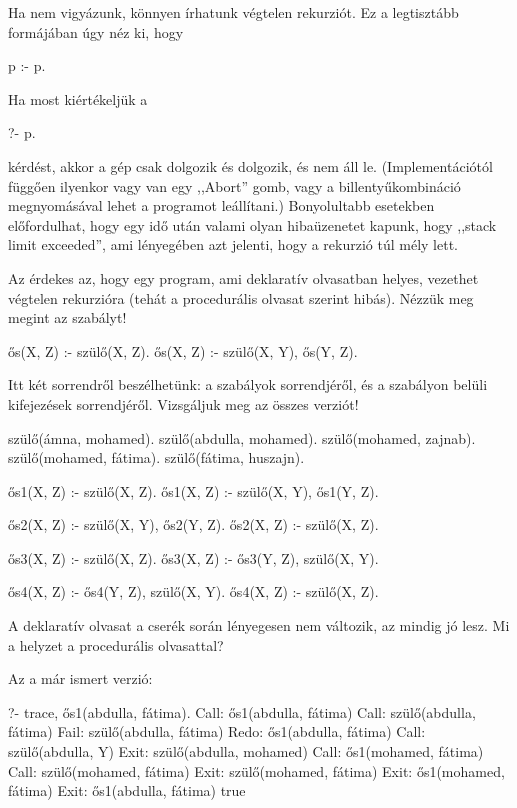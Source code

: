 Ha nem vigyázunk, könnyen írhatunk végtelen rekurziót. Ez a legtisztább formájában úgy néz ki, hogy
\begin{program}
p :- p.
\end{program}

Ha most kiértékeljük a
\begin{query}
?- p.
\end{query}
kérdést, akkor a gép csak dolgozik és dolgozik, és
nem áll le. (Implementációtól függően ilyenkor vagy
van egy ,,Abort'' gomb, vagy a 
billentyűkombináció megnyomásával lehet a programot
leállítani.) Bonyolultabb esetekben előfordulhat,
hogy egy idő után valami olyan hibaüzenetet kapunk,
hogy ,,stack limit exceeded'', ami lényegében azt
jelenti, hogy a rekurzió túl mély lett.

Az érdekes az, hogy egy program, ami deklaratív
olvasatban helyes, vezethet végtelen rekurzióra
(tehát a procedurális olvasat szerint hibás). Nézzük
meg megint az  szabályt!
\begin{program}
ős(X, Z) :- szülő(X, Z).
ős(X, Z) :- szülő(X, Y), ős(Y, Z).
\end{program}
Itt két sorrendről beszélhetünk: a szabályok
sorrendjéről, és a szabályon belüli kifejezések
sorrendjéről. Vizsgáljuk meg az összes verziót!
\begin{program}
szülő(ámna, mohamed).
szülő(abdulla, mohamed).
szülő(mohamed, zajnab).
szülő(mohamed, fátima).
szülő(fátima, huszajn).

ős1(X, Z) :- szülő(X, Z).
ős1(X, Z) :- szülő(X, Y), ős1(Y, Z).

ős2(X, Z) :- szülő(X, Y), ős2(Y, Z).
ős2(X, Z) :- szülő(X, Z).

ős3(X, Z) :- szülő(X, Z).
ős3(X, Z) :- ős3(Y, Z), szülő(X, Y).

ős4(X, Z) :- ős4(Y, Z), szülő(X, Y).
ős4(X, Z) :- szülő(X, Z).
\end{program}
A deklaratív olvasat a cserék során lényegesen nem
változik, az mindig jó lesz. Mi a helyzet a
procedurális olvasattal?

Az  a már ismert verzió:
\begin{query}
?- trace, ős1(abdulla, fátima).
Call: ős1(abdulla, fátima)
  Call: szülő(abdulla, fátima)
  Fail: szülő(abdulla, fátima)
Redo: ős1(abdulla, fátima)
  Call: szülő(abdulla, Y)
  Exit: szülő(abdulla, mohamed)
  Call: ős1(mohamed, fátima)
    Call: szülő(mohamed, fátima)
    Exit: szülő(mohamed, fátima)
  Exit: ős1(mohamed, fátima)
Exit: ős1(abdulla, fátima)
true
\end{query}

